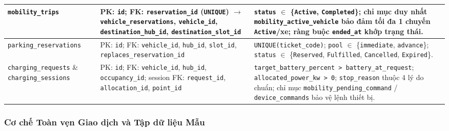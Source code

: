 \begin{longtable}{>{\raggedright\arraybackslash\small}p{3.6cm} >{\raggedright\arraybackslash\small}p{4.3cm} >{\raggedright\arraybackslash}p{6.4cm}}
\midrule
\texttt{mobility\_trips} & PK: \texttt{id}; FK: \texttt{reservation\_id} (\texttt{UNIQUE}) $\to$ \texttt{vehicle\_reservations}, \texttt{vehicle\_id}, \texttt{destination\_hub\_id}, \texttt{destination\_slot\_id} & \texttt{status} $\in$ \{\texttt{Active}, \texttt{Completed}\}; chỉ mục duy nhất \texttt{mobility\_active\_vehicle} bảo đảm tối đa 1 chuyến \texttt{Active}/xe; ràng buộc \texttt{ended\_at} khớp trạng thái. \\
\midrule
\texttt{parking\_\allowbreak reservations} & PK: \texttt{id}; FK: \texttt{vehicle\_id}, \texttt{hub\_id}, \texttt{slot\_id}, \texttt{replaces\_reservation\_id} & \texttt{UNIQUE(ticket\_code)}; \texttt{pool} $\in$ \{\texttt{immediate}, \texttt{advance}\}; \texttt{status} $\in$ \{\texttt{Reserved}, \texttt{Fulfilled}, \texttt{Cancelled}, \texttt{Expired}\}. \\
\midrule
\texttt{charging\_\allowbreak requests} \& \texttt{charging\_\allowbreak sessions} & PK: \texttt{id}; FK: \texttt{vehicle\_id}, \texttt{hub\_id}, \texttt{occupancy\_id}; session FK: \texttt{request\_id}, \texttt{allocation\_id}, \texttt{point\_id} & \texttt{target\_battery\_percent > battery\_at\_request}; \texttt{allocated\_power\_kw > 0}; \texttt{stop\_reason} thuộc 4 lý do chuẩn; chỉ mục \texttt{mobility\_pending\_command} / \texttt{device\_commands} bảo vệ lệnh thiết bị. \\
\end{longtable}

\subsubsection*{Cơ chế Toàn vẹn Giao dịch và Tập dữ liệu Mẫu}

